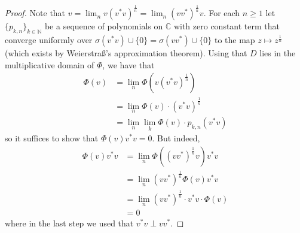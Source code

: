 \documentclass[10pt,a4paper]{amsart}
\newcommand{\bb}[1]{\mathbb{#1}}
\begin{document}
\begin{proof}
Note that $v=\lim_nv(v^*v)^\frac{1}{n}=\lim_n (vv^*)^\frac{1}{n}v$. For each $n\ge1$ let $\{p_{k,n}\}_{k\in\bb{N}}$ be a sequence of polynomials on $\bb{C}$ with zero constant term that converge uniformly over $\sigma(v^*v)\cup\{0\}=\sigma(vv^*)\cup\{0\}$ to the map $z\mapsto z^\frac{1}{n}$ (which exists by Weierstra\ss 's approximation theorem). Using that $D$ lies in the multiplicative domain of $\Phi$, we have that
\begin{align*}
\Phi(v)&=\lim_n\Phi(v(v^*v)^\frac{1}{n})\\
&=\lim_n\Phi(v)\cdot (v^*v)^\frac{1}{n}\\
&=\lim_n\lim_k\Phi(v)\cdot p_{k,n}(v^*v)
\end{align*}
so it suffices to show that $\Phi(v)v^*v=0$. But indeed,
\begin{align*}
\Phi(v)v^*v&=\lim_n\Phi((vv^*)^\frac{1}{n}v)v^*v\\
&=\lim_n(vv^*)^\frac{1}{n}\Phi(v)v^*v\\
&=\lim_n(vv^*)^\frac{1}{n}\cdot v^*v\cdot \Phi(v)\\
&=0
\end{align*}
where in the last step we used that $v^*v\perp vv^*$.
\end{proof}
\end{document}

